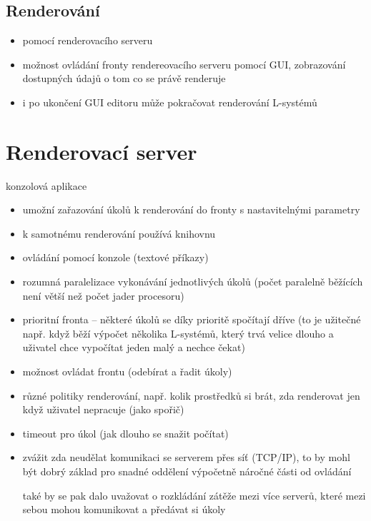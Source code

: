\documentclass[12pt, a4paper]{article}
\begin{document}
\subsection{Renderování}
\begin{itemize}
	\item pomocí renderovacího serveru
	
	\item možnost ovládání fronty rendereovacího serveru pomocí GUI, zobrazování dostupných údajů o tom co se právě renderuje
	
	\item i po ukončení GUI editoru může pokračovat renderování L-systémů
\end{itemize}


\section{Renderovací server}
konzolová aplikace

\begin{itemize}
	\item umožní zařazování úkolů k renderování do fronty s nastavitelnými parametry
	
	\item k samotnému renderování používá knihovnu
	
	\item ovládání pomocí konzole (textové příkazy)
	
	\item rozumná paralelizace vykonávání jednotlivých úkolů (počet paralelně běžících není větší než počet jader procesoru)
	
	\item prioritní fronta -- některé úkolů se díky prioritě spočítají dříve (to je užitečné např. když běží výpočet několika L-systémů, který trvá velice dlouho a uživatel chce vypočítat jeden malý a nechce čekat)
	
	\item možnost ovládat frontu (odebírat a řadit úkoly)
	
	\item různé politiky renderování, např. kolik prostředků si brát, zda renderovat jen když uživatel nepracuje (jako spořič)
	
	\item timeout pro úkol (jak dlouho se snažit počítat)
	
	\item zvážit zda neudělat komunikaci se serverem přes síť (TCP/IP), to by mohl být dobrý základ pro snadné oddělení výpočetně náročné části od ovládání

také by se pak dalo uvažovat o rozkládání zátěže mezi více serverů, které mezi sebou mohou komunikovat a předávat si úkoly
\end{itemize}
\end{document}
